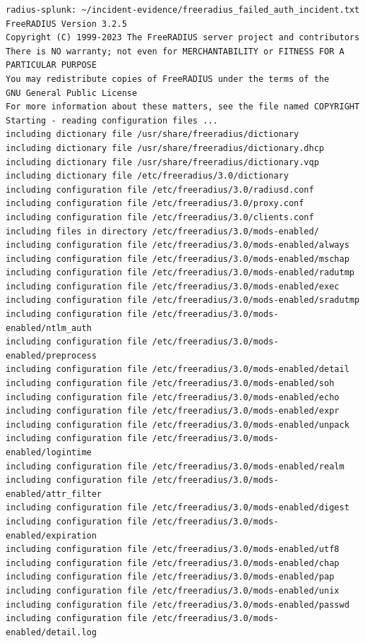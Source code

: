 \documentclass[11pt]{article}
\begin{document}
\begin{verbatim}
radius-splunk: ~/incident-evidence/freeradius_failed_auth_incident.txt
FreeRADIUS Version 3.2.5
Copyright (C) 1999-2023 The FreeRADIUS server project and contributors
There is NO warranty; not even for MERCHANTABILITY or FITNESS FOR A
PARTICULAR PURPOSE
You may redistribute copies of FreeRADIUS under the terms of the
GNU General Public License
For more information about these matters, see the file named COPYRIGHT
Starting - reading configuration files ...
including dictionary file /usr/share/freeradius/dictionary
including dictionary file /usr/share/freeradius/dictionary.dhcp
including dictionary file /usr/share/freeradius/dictionary.vqp
including dictionary file /etc/freeradius/3.0/dictionary
including configuration file /etc/freeradius/3.0/radiusd.conf
including configuration file /etc/freeradius/3.0/proxy.conf
including configuration file /etc/freeradius/3.0/clients.conf
including files in directory /etc/freeradius/3.0/mods-enabled/
including configuration file /etc/freeradius/3.0/mods-enabled/always
including configuration file /etc/freeradius/3.0/mods-enabled/mschap
including configuration file /etc/freeradius/3.0/mods-enabled/radutmp
including configuration file /etc/freeradius/3.0/mods-enabled/exec
including configuration file /etc/freeradius/3.0/mods-enabled/sradutmp
including configuration file /etc/freeradius/3.0/mods-enabled/ntlm_auth
including configuration file /etc/freeradius/3.0/mods-enabled/preprocess
including configuration file /etc/freeradius/3.0/mods-enabled/detail
including configuration file /etc/freeradius/3.0/mods-enabled/soh
including configuration file /etc/freeradius/3.0/mods-enabled/echo
including configuration file /etc/freeradius/3.0/mods-enabled/expr
including configuration file /etc/freeradius/3.0/mods-enabled/unpack
including configuration file /etc/freeradius/3.0/mods-enabled/logintime
including configuration file /etc/freeradius/3.0/mods-enabled/realm
including configuration file /etc/freeradius/3.0/mods-enabled/attr_filter
including configuration file /etc/freeradius/3.0/mods-enabled/digest
including configuration file /etc/freeradius/3.0/mods-enabled/expiration
including configuration file /etc/freeradius/3.0/mods-enabled/utf8
including configuration file /etc/freeradius/3.0/mods-enabled/chap
including configuration file /etc/freeradius/3.0/mods-enabled/pap
including configuration file /etc/freeradius/3.0/mods-enabled/unix
including configuration file /etc/freeradius/3.0/mods-enabled/passwd
including configuration file /etc/freeradius/3.0/mods-enabled/detail.log

\end{verbatim}
\end{document}
